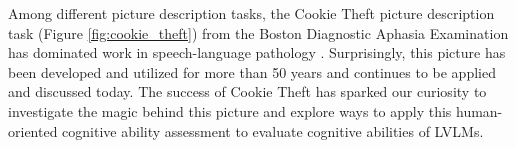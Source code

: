 
Among different picture description tasks, the Cookie Theft picture description task (Figure \ref{fig:cookie_theft}) from the Boston Diagnostic Aphasia Examination \cite{goodglass2001-ej} has dominated work in speech-language pathology \cite{describe-ctp}. 
Surprisingly, this picture has been developed and utilized for more than 50 years and continues to be applied and discussed today. 
The success of Cookie Theft has sparked our curiosity to investigate the 
magic behind this picture and explore ways to apply this human-oriented 
cognitive ability assessment to evaluate cognitive abilities of LVLMs. 

